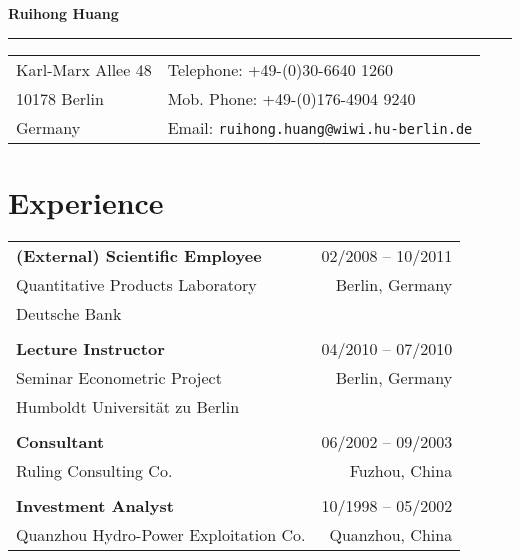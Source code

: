 \documentclass[a4paper,11pt]{article}
\begin{document}
\noindent\textbf{Ruihong Huang}\\
\rule[5pt]{1.1\textwidth}{1pt}
\begin{tabular}[h]{p{}p{}}
  Karl-Marx Allee 48  & Telephone: +49-(0)30-6640 1260 \\
  10178 Berlin        & Mob. Phone: +49-(0)176-4904 9240 \\
  Germany             & Email: \verb|ruihong.huang@wiwi.hu-berlin.de| \\
\end{tabular}
\section*{Experience}
\noindent\hspace{20pt}
\begin{xtabular}[h]{p{0.7\textwidth} r}
  \textbf{(External) Scientific Employee}  & 02/2008 -- 10/2011 \\
  Quantitative Products Laboratory&  Berlin, Germany\\
  Deutsche Bank &\hspace*{0.3\textwidth}\\
 &\\
  \textbf{Lecture Instructor} & 04/2010 -- 07/2010 \\
   Seminar Econometric Project &  Berlin, Germany \\
   Humboldt Universit\"at zu Berlin & \\
 &\\
  \textbf{Consultant} & 06/2002 -- 09/2003 \\
  Ruling Consulting Co. & Fuzhou, China  \\
 &\\
  \textbf{Investment Analyst} & 10/1998 -- 05/2002 \\
   Quanzhou Hydro-Power Exploitation Co. & Quanzhou, China  \\
\end{xtabular}
\end{document}
